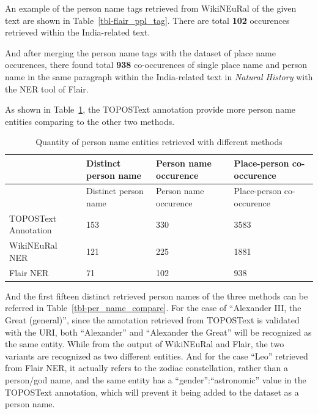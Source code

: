 \documentclass[
  12pt,
]{article}
\begin{document}
An example of the person name tags retrieved from WikiNEuRal of the
given text are shown in Table~\ref{tbl-flair_ppl_tag}. There are total
\textbf{102} occurences retrieved within the India-related text.

And after merging the person name tags with the dataset of place name
occurences, there found total \textbf{938} co-occurences of single place
name and person name in the same paragraph within the India-related text
in \emph{Natural History} with the NER tool of Flair.

As shown in Table~\ref{tbl-ner_compare}, the TOPOSText annotation
provide more person name entities comparing to the other two methods.

\hypertarget{tbl-ner_compare}{}
\begin{longtable}[]{@{}llll@{}}
\caption{\label{tbl-ner_compare}Quantity of person name entities
retrieved with different methods}\tabularnewline
\toprule\noalign{}
& Distinct person name & Person name occurence & Place-person
co-occurence \\
\midrule\noalign{}
\endfirsthead
\toprule\noalign{}
& Distinct person name & Person name occurence & Place-person
co-occurence \\
\midrule\noalign{}
\endhead
\bottomrule\noalign{}
\endlastfoot
TOPOSText Annotation & 153 & 330 & 3583 \\
WikiNEuRal NER & 121 & 225 & 1881 \\
Flair NER & 71 & 102 & 938 \\
\end{longtable}

And the first fifteen distinct retrieved person names of the three
methods can be referred in Table~\ref{tbl-per_name_compare}. For the
case of ``Alexander III, the Great (general)'', since the annotation
retrieved from TOPOSText is validated with the URI, both ``Alexander''
and ``Alexander the Great'' will be recognized as the same entity. While
from the output of WikiNEuRal and Flair, the two variants are recognized
as two different entities. And for the case ``Leo'' retrieved from Flair
NER, it actually refers to the zodiac constellation, rather than a
person/god name, and the same entity has a ``gender'':``astronomic''
value in the TOPOSText annotation, which will prevent it being added to
the dataset as a person name.
\end{document}
